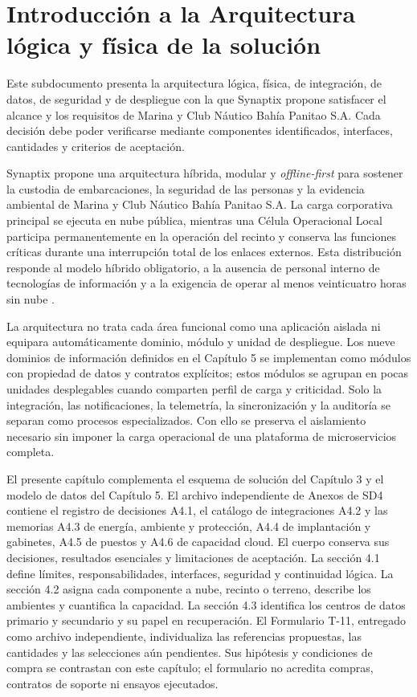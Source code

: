 \setcounter{chapter}{3}
\renewcommand{\tablename}{Tabla}
\chapter{Introducción a la Arquitectura lógica y física de la solución}

Este subdocumento presenta la arquitectura lógica, física, de integración, de datos, de seguridad y de despliegue con la que Synaptix propone satisfacer el alcance y los requisitos de Marina y Club Náutico Bahía Panitao S.A. Cada decisión debe poder verificarse mediante componentes identificados, interfaces, cantidades y criterios de aceptación.

Synaptix propone una arquitectura híbrida, modular y \emph{offline-first} para sostener la custodia de embarcaciones, la seguridad de las personas y la evidencia ambiental de Marina y Club Náutico Bahía Panitao S.A. La carga corporativa principal se ejecuta en nube pública, mientras una Célula Operacional Local participa permanentemente en la operación del recinto y conserva las funciones críticas durante una interrupción total de los enlaces externos. Esta distribución responde al modelo híbrido obligatorio, a la ausencia de personal interno de tecnologías de información y a la exigencia de operar al menos veinticuatro horas sin nube \parencites[art. 16, pp. 11--12]{pucv-admin}[cap. 3, pp. 8--10]{pucv-transversal}.

La arquitectura no trata cada área funcional como una aplicación aislada ni equipara automáticamente dominio, módulo y unidad de despliegue. Los nueve dominios de información definidos en el Capítulo 5 se implementan como módulos con propiedad de datos y contratos explícitos; estos módulos se agrupan en pocas unidades desplegables cuando comparten perfil de carga y criticidad. Solo la integración, las notificaciones, la telemetría, la sincronización y la auditoría se separan como procesos especializados. Con ello se preserva el aislamiento necesario sin imponer la carga operacional de una plataforma de microservicios completa.

El presente capítulo complementa el esquema de solución del Capítulo 3 y el modelo de datos del Capítulo 5. El archivo independiente de Anexos de SD4 contiene el registro de decisiones A4.1, el catálogo de integraciones A4.2 y las memorias A4.3 de energía, ambiente y protección, A4.4 de implantación y gabinetes, A4.5 de puestos y A4.6 de capacidad cloud. El cuerpo conserva sus decisiones, resultados esenciales y limitaciones de aceptación. La sección 4.1 define límites, responsabilidades, interfaces, seguridad y continuidad lógica. La sección 4.2 asigna cada componente a nube, recinto o terreno, describe los ambientes y cuantifica la capacidad. La sección 4.3 identifica los centros de datos primario y secundario y su papel en recuperación. El Formulario T-11, entregado como archivo independiente, individualiza las referencias propuestas, las cantidades y las selecciones aún pendientes. Sus hipótesis y condiciones de compra se contrastan con este capítulo; el formulario no acredita compras, contratos de soporte ni ensayos ejecutados.

